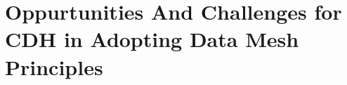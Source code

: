 
\chapter{Oppurtunities And Challenges for \gls{CDH} in Adopting Data Mesh Principles}
\label{Chap: Opportunities And Challenges}
